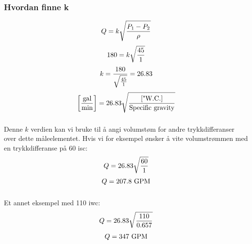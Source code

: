 \documentclass{beamer}
\begin{document}
\begin{frame}
	\frametitle{Hvordan finne k}

	


%
%
$$Q = k \sqrt{{P_1 - P_2} \over \rho}$$
%
$$180 = k \sqrt{{45} \over 1}$$
%
$$k = {180 \over \sqrt{45 \over 1}} = 26.83$$
%
%
$$\left[\hbox{gal} \over \hbox{min}\right] = 26.83 \sqrt{\left[\hbox{"W.C.}\right] \over \hbox{Specific gravity}}$$
%
\end{frame}
\begin{frame}
	\frametitle{}

	


Denne $k$ verdien kan vi bruke til å angi volumstøm for andre trykkdifferanser over dette måleelementet. Hvis vi for eksempel ønsker å vite volumstrømmen med en trykkdifferanse på 60 isc:
%
$$Q = 26.83 \sqrt{60 \over 1}$$
%
$$Q = 207.8 \hbox{ GPM}$$
%
\end{frame}
\begin{frame}
	\frametitle{}

	



Et annet eksempel med 110 iwc:
%
$$Q = 26.83 \sqrt{110 \over 0.657}$$
%
$$Q = 347 \hbox{ GPM}$$
%
\end{frame}
\end{document}

